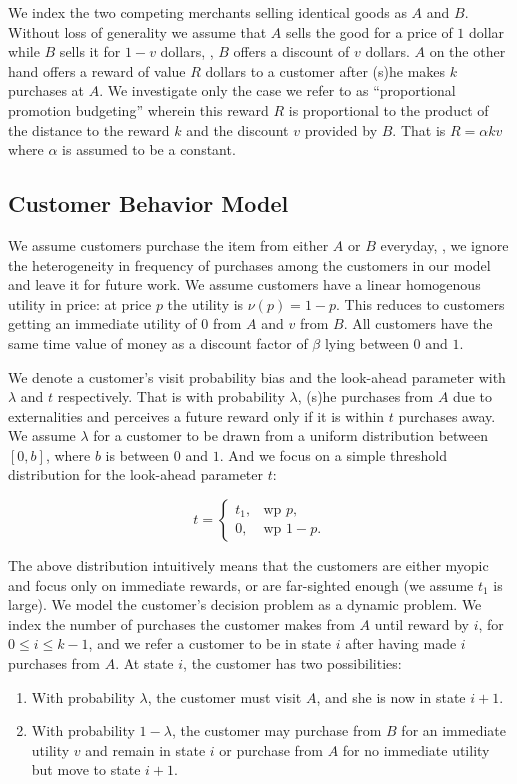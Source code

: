 We index the two competing merchants selling identical goods as $A$ and $B$.
Without loss of generality we assume that $A$ sells the good for a price of $1$ dollar while $B$ sells it for $1-v$ dollars, \ie, $B$ offers a discount of $v$ dollars. 
$A$ on the other hand offers a reward of value $R$ dollars to a customer after (s)he makes $k$ purchases at $A$. 
We investigate only the case we refer to as ``proportional promotion budgeting'' wherein this reward $R$ is proportional to the product of the distance to the reward $k$ and the discount $v$ provided by $B$.
That is $R = \alpha k v$ where $\alpha$ is assumed to be a constant.

\subsection{Customer Behavior Model}
We assume customers purchase the item from either $A$ or $B$ everyday, \ie, we ignore the heterogeneity in frequency of purchases among the customers in our model and leave it for future work.
We assume customers have a linear homogenous utility in price: at price $p$ the utility is $\nu(p) = 1-p$. 
This reduces to customers getting an immediate utility of $0$ from $A$ and $v$ from $B$.
All customers have the same time value of money as a discount factor of $\beta$ lying between $0$ and $1$.

We denote a customer's visit probability bias and the look-ahead parameter with $\lambda$ and $t$ respectively. 
That is with probability $\lambda$, (s)he purchases from $A$ due to externalities and perceives a future reward only if it is within $t$ purchases away. 
We assume $\lambda$ for a customer to be drawn from a uniform distribution between $[0,b]$, where $b$ is between $0$ and $1$.
And we focus on a simple threshold distribution for the look-ahead parameter $t$: 

\begin{equation*}
  t=\begin{cases}
    t_1, & \text{wp } p,\\
    0, & \text{wp } 1-p.
  \end{cases}
\end{equation*}

The above distribution intuitively means that the customers are either myopic and focus only on immediate rewards, or are far-sighted enough (we assume $t_1$ is large).
We model the customer's decision problem as a dynamic problem. We index the number of purchases the customer makes from $A$ until reward by $i$, for $0 \leq i \leq k-1$, and we refer a customer to be in state $i$ after having made $i$ purchases from $A$. At state $i$, the customer has two possibilities:
\begin{enumerate}
\item
With probability $\lambda$, the customer must visit $A$, and she is now in state $i+1$.
\item
With probability $1-\lambda$, the customer may purchase from $B$ for an immediate utility $v$ and remain in state $i$ or purchase from $A$ for no immediate utility but move to state $i+1$.
\end{enumerate}

